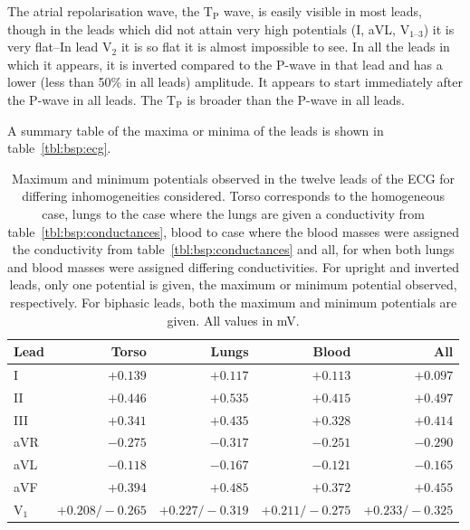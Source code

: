 The atrial repolarisation wave, the $\text{T}_{\text{P}}$ wave, is easily
visible in most leads, though in the leads which did not attain very high
potentials (I, aVL, $\text{V}_{\text{1--3}}$) it is very flat--In lead
$\text{V}_{\text{2}}$ it is so flat it is almost impossible to see.
In all the leads in which it appears, it is inverted compared to the P-wave in
that lead and has a lower (less than 50\% in all leads) amplitude.
It appears to start immediately after the P-wave in all leads.
The $\text{T}_{\text{P}}$ is broader than the P-wave in all leads.

A summary table of the maxima or minima of the leads is shown in
table~\ref{tbl:bsp:ecg}.


\begin{table}
    \caption[Maximum and minimum potentials observed in ECG leads]{
        Maximum and minimum potentials observed in the twelve leads of the ECG
        for differing inhomogeneities considered.
        Torso corresponds to the homogeneous case, lungs to the case where the
        lungs are given a conductivity from table~\ref{tbl:bsp:conductances},
        blood to case where the blood masses were assigned the conductivity from
        table~\ref{tbl:bsp:conductances} and all, for when both lungs and blood
        masses were assigned differing conductivities.
        For upright and inverted leads, only one potential is given, the maximum
        or minimum potential observed, respectively.
        For biphasic leads, both the maximum and minimum potentials are given.
        All values in mV.
    }
    \begin{tabular}{ l r r r r }
    \toprule
    Lead & Torso & Lungs & Blood & All \\
    \midrule
    I                       & $+0.139$ & $+0.117$ & $+0.113$ & $+0.097$ \\
    II                      & $+0.446$ & $+0.535$ & $+0.415$ & $+0.497$ \\
    III                     & $+0.341$ & $+0.435$ & $+0.328$ & $+0.414$ \\
    aVR                     & $-0.275$ & $-0.317$ & $-0.251$ & $-0.290$ \\
    aVL                     & $-0.118$ & $-0.167$ & $-0.121$ & $-0.165$ \\
    aVF                     & $+0.394$ & $+0.485$ & $+0.372$ & $+0.455$ \\
    $\text{V}_{\text{1}}$   & $+0.208/-0.265$ & $+0.227/-0.319$ & $+0.211/-0.275$ & $+0.233/-0.325$ \\

\end{tabular}
\end{table}
